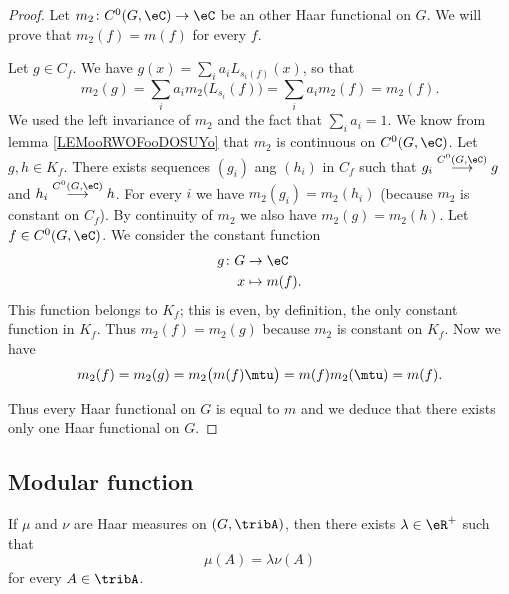 \begin{proof}
	Let \( m_2\colon C^0(G,\eC)\to \eC\) be an other Haar functional on \( G\). We will prove that \( m_2(f)=m(f)\) for every \( f\).
	\begin{subproof}
		\spitem[\( m_2\) is constant on \( C_f\)]
		Let \( g\in C_f\). We have \( g(x)=\sum_ia_iL_{s_i(f)}(x)\), so that
		\begin{equation}
			m_2(g)=\sum_ia_im_2\big(L_{s_i}(f)\big)=\sum_ia_im_2(f)=m_2(f).
		\end{equation}
		We used the left invariance of \( m_2\) and the fact that \( \sum_ia_i=1\).
		\spitem[\( m_2\) is constant on \( K_f\)]
		We know from lemma \ref{LEMooRWOFooDOSUYo} that \( m_2\) is continuous on \( C^0(G,\eC)\). Let \( g,h\in K_f\). There exists sequences \( (g_i)\) ang \( (h_i)\) in \( C_f\) such that \( g_i\stackrel{C^0(G,\eC)}{\longrightarrow}g\) and \( h_i\stackrel{C^0(G,\eC)}{\longrightarrow} h\). For every \( i\) we have \( m_2(g_i)=m_2(h_i)\) (because \( m_2\) is constant on \( C_f\)). By continuity of \( m_2\) we also have \( m_2(g)=m_2(h)\).
		\spitem[\( m_2=m\)]
		Let \( f\in C^0(G,\eC)\). We consider the constant function
		\begin{equation}
			\begin{aligned}
				g\colon G & \to \eC       \\
				x         & \mapsto m(f).
			\end{aligned}
		\end{equation}
		This function belongs to \( K_f\); this is even, by definition, the only constant function in \( K_f\). Thus \( m_2(f)=m_2(g)\) because \( m_2\) is constant on \( K_f\). Now we have
		\begin{equation}
			m_2(f)=m_2(g)=m_2\big( m(f)\mtu \big)=m(f)m_2(\mtu)=m(f).
		\end{equation}
	\end{subproof}
	Thus every Haar functional on \( G\) is equal to \( m\) and we deduce that there exists only one Haar functional on \( G\).
\end{proof}


\subsection{Modular function}

\begin{lemma}       \label{LEMooLBEZooVuQnan}
	If \( \mu\) and \( \nu\) are Haar measures on \( (G,\tribA)\), then there exists \( \lambda\in \eR^+\) such that
	\begin{equation}
		\mu(A)=\lambda \nu(A)
	\end{equation}
	for every \( A\in\tribA\).
\end{lemma}

